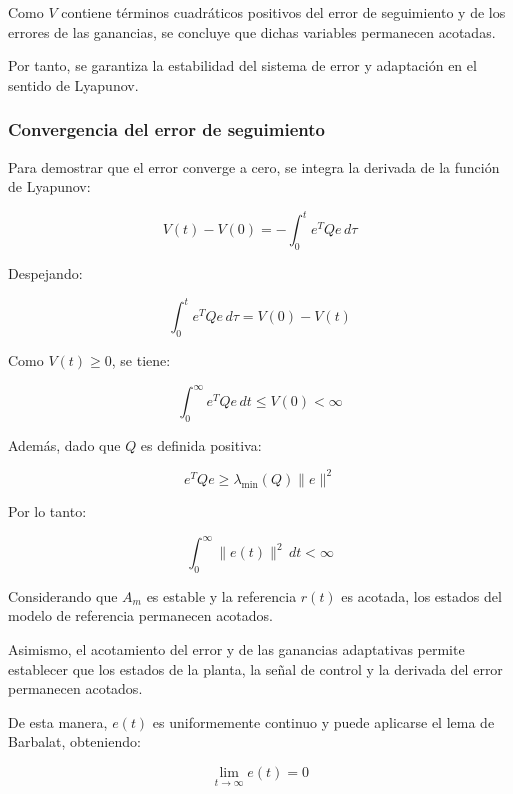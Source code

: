 \documentclass[conference,letterpaper]{IEEEtran}
\begin{document}
Como $V$ contiene términos cuadráticos positivos
del error de seguimiento y de los errores de las
ganancias, se concluye que dichas variables
permanecen acotadas.

Por tanto, se garantiza la estabilidad del sistema
de error y adaptación en el sentido de Lyapunov.

\subsubsection{Convergencia del error de seguimiento}

Para demostrar que el error converge a cero,
se integra la derivada de la función de Lyapunov:

\begin{equation}
    V(t)-V(0)=-\int_0^t e^TQe\,d\tau
\end{equation}

Despejando:

\begin{equation}
    \int_0^t e^TQe\,d\tau=V(0)-V(t)
\end{equation}

Como $V(t)\geq0$, se tiene:

\begin{equation}
    \boxed{
    \int_0^\infty e^TQe\,dt\leq V(0)<\infty
    }
\end{equation}

Además, dado que $Q$ es definida positiva:

\begin{equation}
    e^TQe\geq\lambda_{\min}(Q)\|e\|^2
\end{equation}

Por lo tanto:

\begin{equation}
    \int_0^\infty \|e(t)\|^2\,dt<\infty
\end{equation}

Considerando que $A_m$ es estable y la referencia
$r(t)$ es acotada, los estados del modelo de
referencia permanecen acotados.

Asimismo, el acotamiento del error y de las
ganancias adaptativas permite establecer que
los estados de la planta, la señal de control
y la derivada del error permanecen acotados.

De esta manera, $e(t)$ es uniformemente continuo
y puede aplicarse el lema de Barbalat, obteniendo:

\begin{equation}
    \boxed{\lim_{t\rightarrow\infty}e(t)=0}
\end{equation}
\end{document}
